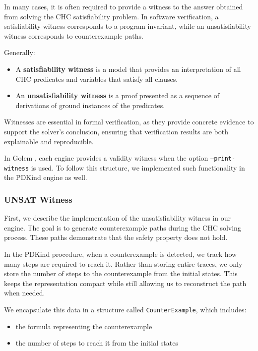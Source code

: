 \noindent In many cases, it is often required to provide a witness to the
answer obtained from solving the CHC satisfiability problem. In software
verification, a satisfiability witness corresponds to a program invariant,
while an unsatisfiability witness corresponds to counterexample paths.

Generally:
\begin{itemize}
    \item A \textbf{satisfiability witness} is a model that provides an interpretation of all CHC predicates and variables that satisfy all clauses.
    \item An \textbf{unsatisfiability witness} is a proof presented as a sequence of derivations of ground instances of the predicates. 
\end{itemize}

Witnesses are essential in formal verification, as they provide concrete
evidence to support the solver's conclusion, ensuring that verification results
are both explainable and reproducible.

In Golem \cite{blicha_golem_2023}, each engine provides a validity witness when
the option \texttt{--print-witness} is used. To follow this structure, we
implemented such functionality in the PDKind engine as well.

\subsubsection*{UNSAT Witness} \label{UNSATWit}

\noindent First, we describe the implementation of the unsatisfiability witness
in our engine. The goal is to generate counterexample paths during the CHC
solving process. These paths demonstrate that the safety property does not
hold.

In the PDKind procedure, when a counterexample is detected, we track how many
steps are required to reach it. Rather than storing entire traces, we only
store the number of steps to the counterexample from the initial states. This
keeps the representation compact while still allowing us to reconstruct the
path when needed.

We encapsulate this data in a structure called \texttt{CounterExample}, which includes:
\begin{itemize}
    \item the formula representing the counterexample
    \item the number of steps to reach it from the initial states
\end{itemize}


